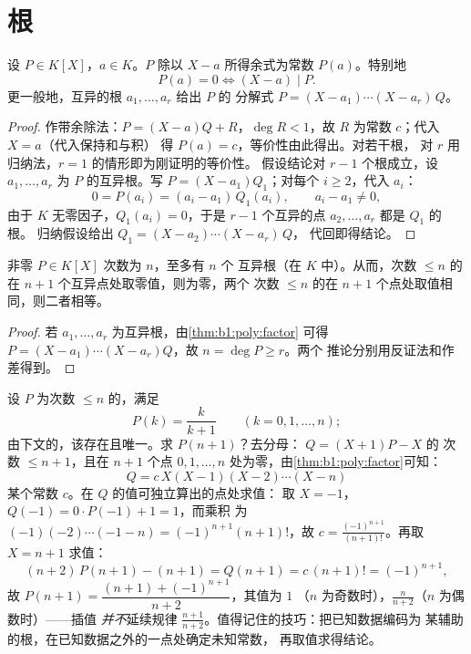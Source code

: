 \section{根}

\begin{theorem}[因式定理]\label{thm:b1:poly:factor}
设 $P \in K[X]$，$a \in K$。$P$ 除以
$X - a$ 所得余式为常数 $P(a)$。特别地
\[
P(a) = 0 \iff (X - a) \mid P .
\]
更一般地，互异的根 $a_1, \dots, a_r$ 给出 $P$ 的
分解式 $P = (X - a_1)\cdots(X - a_r)\, Q$。
\end{theorem}

\begin{proof}
作带余除法：$P = (X - a) Q + R$，$\deg R < 1$，故 $R$ 为常数
$c$；代入 $X = a$（代入保持和与积）
得 $P(a) = c$，等价性由此得出。对若干根，
对 $r$ 用归纳法，$r = 1$ 的情形即为刚证明的等价性。
假设结论对 $r - 1$ 个根成立，设 $a_1, \dots, a_r$
为 $P$ 的互异根。写 $P = (X - a_1)Q_1$；对每个 $i
\geq 2$，代入 $a_i$：
\[
0 = P(a_i) = (a_i - a_1)\,Q_1(a_i),
\qquad a_i - a_1 \neq 0 ,
\]
由于 $K$ 无零因子，$Q_1(a_i) = 0$，于是 $r - 1$
个互异的点 $a_2, \dots, a_r$ 都是 $Q_1$ 的根。
归纳假设给出 $Q_1 = (X - a_2)\cdots(X - a_r)\,Q$，
代回即得结论。
\end{proof}

\begin{corollary}[$n$ 次多项式至多有 $n$ 个根]\label{cor:b1:poly:nroots}
非零 $P \in K[X]$ 次数为 $n$，至多有 $n$ 个
互异根（在 $K$ 中）。从而，次数 $\leq n$ 的在
$n + 1$ 个互异点处取零值，则为零，两个
次数 $\leq n$ 的在 $n+1$ 个点处取值相同，则二者相等。
\end{corollary}

\begin{proof}
若 $a_1, \dots, a_r$ 为互异根，由\cref{thm:b1:poly:factor}
可得 $P = (X-a_1)\cdots(X-a_r) Q$，故 $n = \deg P \geq r$。两个
推论分别用反证法和作差得到。
\end{proof}

\begin{example}[辅助多项式技巧]\label{ex:b1:poly:auxiliary}
设 $P$ 为次数 $\leq n$ 的，满足
\[
P(k) = \frac{k}{k+1} \qquad (k = 0, 1, \dots, n) ;
\]
由下文的，该存在且唯一。求
$P(n+1)$？去分母： $Q = (X+1)P - X$ 的
次数 $\leq n + 1$，且在 $n + 1$ 个点 $0, 1,
\dots, n$ 处为零，由\cref{thm:b1:poly:factor}可知：
\[
Q = c\,X(X-1)(X-2)\cdots(X-n)
\]
某个常数 $c$。在 $Q$ 的值可独立算出的点处求值：
取 $X = -1$，$Q(-1) = 0 \cdot P(-1) + 1 = 1$，而乘积
为 $(-1)(-2)\cdots(-1-n) = (-1)^{n+1}(n+1)!$，故 $c =
\frac{(-1)^{n+1}}{(n+1)!}$。再取 $X = n + 1$ 求值：
\[
(n+2)\,P(n+1) - (n+1) = Q(n+1) = c\,(n+1)! = (-1)^{n+1} ,
\]
故 $P(n+1) = \dfrac{(n+1) + (-1)^{n+1}}{n+2}$，其值为 $1$
（$n$ 为奇数时），$\frac{n}{n+2}$（$n$ 为偶数时）——插值
\emph{并不}延续规律
$\frac{n+1}{n+2}$。值得记住的技巧：把已知数据编码为
某辅助的根，在已知数据之外的一点处确定未知常数，
再取值求得结论。
\end{example}

